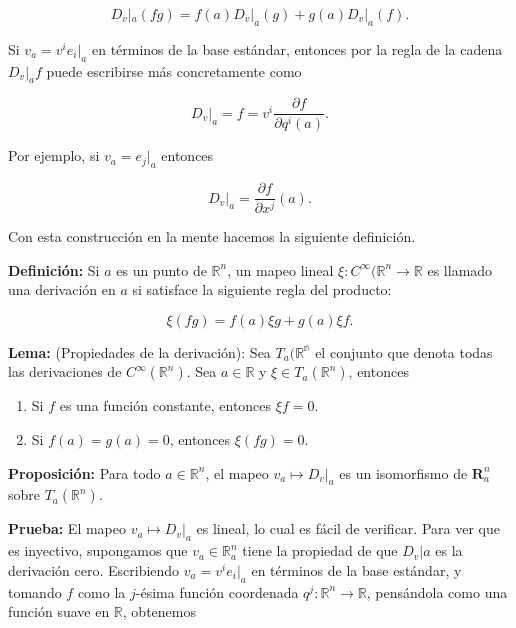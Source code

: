\documentclass[a4paper,10pt]{article}
\numberwithin{equation}{section}
\newcommand{\definicion}{\textbf{Definición: }}
\newcommand{\lema}{\textbf{Lema: }}
\newcommand{\prueba}{\textbf{Prueba: }}
\newcommand{\proposicion}{\textbf{Proposición: }}
\begin{document}
\begin{equation}
 D_v|_a (fg) = f(a)D_v|_a(g) + g(a)D_v|_a(f).
\end{equation}

Si $v_a = v^ie_i|_a$ en términos de la base estándar, entonces por la regla de la 
cadena $D_v|_a f$ puede escribirse más concretamente como 

\begin{equation}
 D_v|_a = f = v^i\frac{\partial f}{\partial q^i (a)}.
\end{equation}

Por ejemplo, si $v_a = e_j|_a$ entonces 

\begin{equation}
 D_v|_a = \frac{\partial f}{\partial x^j}(a).
\end{equation}

Con esta construcción en la mente hacemos la siguiente definición. 

\vspace{.3cm}

\definicion Si $a$ es un punto de $\mathbb{R}^n$, un mapeo lineal
$\xi:C^{\infty}(\mathbb{R}^n \rightarrow \mathbb{R}$ es llamado una derivación 
en $a$ si satisface la siguiente regla del producto:

\begin{equation}
 \xi(fg) = f(a)\xi g + g(a)\xi f.
\end{equation}

\lema (Propiedades de la derivación): Sea $T_a(\mathbb{R^n}$ el conjunto que denota todas las derivaciones de $C^{\infty}(\mathbb{R}^n)$.
Sea $a \in \mathbb{R}$ y $\xi \in T_a(\mathbb{R}^n)$, entonces 

\begin{enumerate}[label=(\alph*)]
 \item Si $f$ es una función constante, entonces $\xi f = 0$.
 \item Si $f(a) = g(a) = 0$, entonces $\xi(fg) = 0$. 
\end{enumerate}

\proposicion Para todo $a \in \mathbb{R}^n$, el mapeo $v_a \mapsto D_v|_a$ es 
un isomorfismo de $\mathbf{R}^n_a$ sobre $T_a(\mathbb{R}^n)$.

\prueba El mapeo  $v_a \mapsto D_v|_a$ es lineal, lo cual es fácil de verificar. 
Para ver que es inyectivo, supongamos que $v_a \in \mathbb{R}^n_a$ tiene 
la propiedad de que $D_v|a$ es la derivación cero. Escribiendo $v_a = v^ie_i|_a$
en términos de la base estándar, y tomando $f$ como la $j$-ésima función 
coordenada $q^j: \mathbb{R}^n \rightarrow \mathbb{R}$, pensándola como 
una función suave en $\mathbb{R}$, obtenemos 
\end{document}
